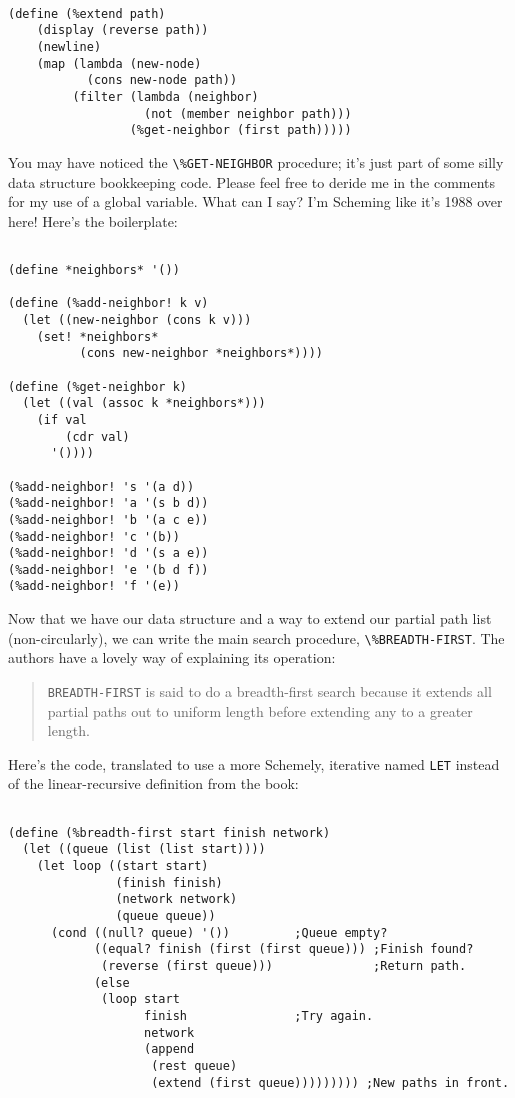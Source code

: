\documentclass[12pt,openright,draft]{book}
\begin{document}
\begin{verbatim}

(define (%extend path)
    (display (reverse path))
    (newline)
    (map (lambda (new-node)
           (cons new-node path))
         (filter (lambda (neighbor)
                   (not (member neighbor path)))
                 (%get-neighbor (first path)))))

\end{verbatim}

You may have noticed the \verb|\%GET-NEIGHBOR| procedure; it's just
part of some silly data structure bookkeeping code.  Please feel free
to deride me in the comments for my use of a global variable.  What
can I say?  I'm Scheming like it's 1988 over here!  Here's the
boilerplate:

\begin{verbatim}

(define *neighbors* '())

(define (%add-neighbor! k v)
  (let ((new-neighbor (cons k v)))
    (set! *neighbors*
          (cons new-neighbor *neighbors*))))

(define (%get-neighbor k)
  (let ((val (assoc k *neighbors*)))
    (if val
        (cdr val)
      '())))

(%add-neighbor! 's '(a d))
(%add-neighbor! 'a '(s b d))
(%add-neighbor! 'b '(a c e))
(%add-neighbor! 'c '(b))
(%add-neighbor! 'd '(s a e))
(%add-neighbor! 'e '(b d f))
(%add-neighbor! 'f '(e))

\end{verbatim}

Now that we have our data structure and a way to extend our partial
path list (non-circularly), we can write the main search procedure,
\verb|\%BREADTH-FIRST|.  The authors have a lovely way of explaining
its operation:

\begin{quote}
\verb|BREADTH-FIRST| is said to do a breadth-first search because it
extends all partial paths out to uniform length before extending any
to a greater length.
\end{quote}

Here's the code, translated to use a more Schemely, iterative named
\verb|LET| instead of the linear-recursive definition from the book:

\begin{verbatim}

(define (%breadth-first start finish network)
  (let ((queue (list (list start))))
    (let loop ((start start)
               (finish finish)
               (network network)
               (queue queue))
      (cond ((null? queue) '())         ;Queue empty?
            ((equal? finish (first (first queue))) ;Finish found?
             (reverse (first queue)))              ;Return path.
            (else
             (loop start
                   finish               ;Try again.
                   network
                   (append
                    (rest queue)
                    (extend (first queue))))))))) ;New paths in front.

\end{verbatim}
\end{document}
